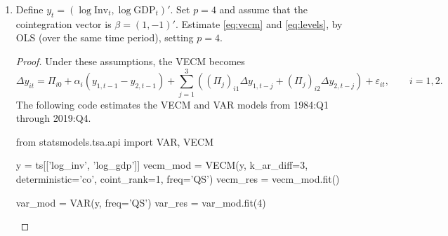 \documentclass[oneside,reqno]{amsart}
\newcommand{\eps}{\varepsilon}
\theoremstyle{definition}
\begin{document}
\begin{enumerate}[label=(\roman*)]
\begin{proof}
\begin{python3code}
ax2.plot(y['log_inv'] - y['log_gdp'], 'k', label='Log Investment-GDP Ratio')
ax2.legend()

plt.show()
\end{python3code}
\end{proof}

\item
Define $y_t = (\log \text{Inv}_t, \log \text{GDP}_t)'$. Set $p=4$ and assume that the cointegration vector is $\beta=(1,-1)'$. Estimate \eqref{eq:vecm} and \eqref{eq:levels}, by OLS (over the same time period), setting $p=4$. 

\begin{proof}
Under these assumptions, the VECM becomes 
\[
	\Delta y_{it} = \Pi_{i0} + \alpha_i (y_{1,t-1} - y_{2,t-1}) + \sum_{j=1}^3 ( (\Pi_j)_{i1} \Delta y_{1,t-j} + (\Pi_j)_{i2} \Delta y_{2,t-j} ) + \eps_{it},
	\qquad i=1,2.
\]
The following code estimates the VECM and VAR models from 1984:Q1 through 2019:Q4. 
\begin{python3code}
from statsmodels.tsa.api import VAR, VECM

y = ts[['log_inv', 'log_gdp']]
vecm_mod = VECM(y, k_ar_diff=3, deterministic='co', coint_rank=1, freq='QS')
vecm_res = vecm_mod.fit()

var_mod = VAR(y, freq='QS')
var_res = var_mod.fit(4)
\end{python3code}


\end{proof}
\end{enumerate}
\end{document}
